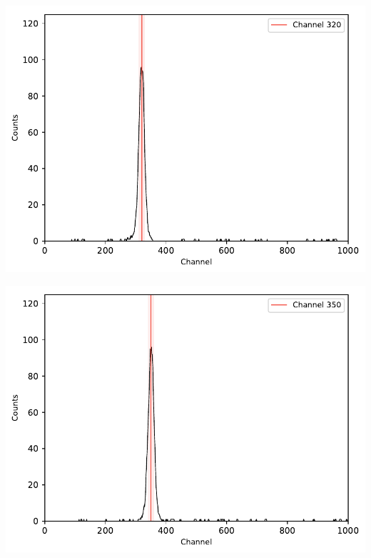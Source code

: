 \begin{multicols}{2}
\begin{center}
\begin{adjustbox}{max width=\linewidth, keepaspectratio}
        \end{adjustbox}
        \label{fig:60CoEnergiewindow2}
    \end{center}
\endminipage
%
\vspace{10mm}
%
\minipage{\linewidth}
    \begin{center}
        \captionsetup{type=figure}
        \begin{adjustbox}{max width=\linewidth, keepaspectratio}
            \includegraphics[]{pdf/60CoZeitspektrum}
        \end{adjustbox}
        \label{fig:60CoZeitspektrum}
    \end{center}
\endminipage
%
\vspace{10mm}
%
\minipage{\linewidth}
    \begin{center}
        \captionsetup{type=figure}
        \begin{adjustbox}{max width=\linewidth, keepaspectratio}
            \includegraphics[]{pdf/60CoZeitspektrum20ns}

\end{adjustbox}
\end{center}
\end{multicols}
